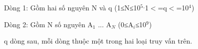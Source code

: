 Dòng 1: Gồm hai số nguyên N và q (1≤N≤10$^5 $$^,$1$<$=q$<$=10$^4$)

Dòng 2: Gồm N số nguyên A$_1$ ... A$_N$ (0≤A$_i$≤10$^9$)

q dòng sau, mỗi dòng thuộc một trong hai loại truy vấn trên.
